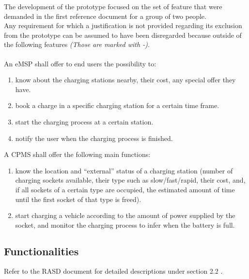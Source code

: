 \documentclass[11pt]{article}
\begin{document}
The development of the prototype focused on the set of feature that were demanded in the first reference document for a group of two people.\\
Any requirement for which a justification is not provided regarding its exclusion from the prototype can be assumed to have been disregarded because outside of the following features \textit{(Those are marked with -)}.\\ \\
An eMSP shall offer to end users the possibility to:
\begin{enumerate}
    \item know about the charging stations nearby, their cost, any special offer they have.
    \item book a charge in a specific charging station for a certain time frame.
    \item start the charging process at a certain station.
    \item notify the user when the charging process is finished.
\end{enumerate}
A CPMS shall offer the following main functions:
\begin{enumerate}
    \item know the location and “external” status of a charging station (number of charging sockets available, their type such as slow/fast/rapid, their cost, and, if all sockets of a certain type are occupied, the estimated amount of time until the first socket of that type is freed).
    \item start charging a vehicle according to the amount of power supplied by the socket, and monitor the charging process to infer when the battery is full.
\end{enumerate}

\subsection{Functionalities}
Refer to the RASD document for detailed descriptions under section 2.2 .
\end{document}
